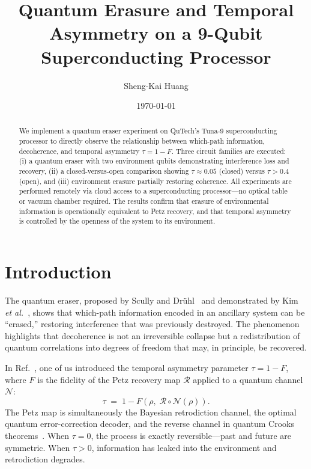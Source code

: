 \documentclass[prl,twocolumn,superscriptaddress,longbibliography,floatfix]{revtex4-2}
\newcommand{\tauasym}{\tau}
\begin{document}
\title{Quantum Erasure and Temporal Asymmetry on a 9-Qubit Superconducting Processor}

\author{Sheng-Kai Huang}

\date{\today}

\begin{abstract}
We implement a quantum eraser experiment on QuTech's Tuna-9
superconducting processor to directly observe the relationship
between which-path information, decoherence, and temporal
asymmetry $\tauasym = 1 - F$.  Three circuit families are
executed: (i) a quantum eraser with two environment qubits
demonstrating interference loss and recovery,
(ii) a closed-versus-open comparison showing
$\tauasym \approx 0.05$ (closed) versus $\tauasym > 0.4$ (open),
and (iii) environment erasure partially restoring coherence.
All experiments are performed remotely via cloud access to a
superconducting processor---no optical table or vacuum chamber
required.  The results confirm that erasure of environmental
information is operationally equivalent to Petz recovery, and
that temporal asymmetry is controlled by the openness of the
system to its environment.
\end{abstract}

\maketitle

\section{Introduction}

The quantum eraser, proposed by Scully and Dr\"{u}hl~\cite{Scully1982}
and demonstrated by Kim \textit{et al.}~\cite{Kim2000}, shows that
which-path information encoded in an ancillary system can be ``erased,''
restoring interference that was previously destroyed.  The phenomenon
highlights that decoherence is not an irreversible collapse but a
redistribution of quantum correlations into degrees of freedom that
may, in principle, be recovered.

In Ref.~\cite{Huang2026}, one of us introduced the temporal asymmetry
parameter $\tauasym = 1 - F$, where $F$ is the fidelity of the Petz
recovery map $\mathcal{R}$ applied to a quantum channel $\mathcal{N}$:
\begin{equation}\label{eq:tau}
  \tauasym \;=\; 1 - F\!\left(\rho,\; \mathcal{R}\circ\mathcal{N}(\rho)\right).
\end{equation}
The Petz map is simultaneously the Bayesian retrodiction channel, the
optimal quantum error-correction decoder, and the reverse channel in
quantum Crooks theorems~\cite{JRSWW2018}.  When $\tauasym = 0$, the
process is exactly reversible---past and future are symmetric.  When
$\tauasym > 0$, information has leaked into the environment and
retrodiction degrades.
\end{document}
